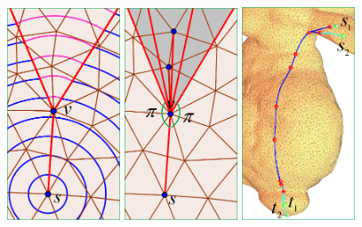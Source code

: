 \begin{figure}[htbp]
\centering
\includegraphics[width=0.3\textwidth]{figs/svg/wavefront_label.png}\hspace{0.05in}
\includegraphics[width=0.3\textwidth]{figs/svg/geodesic_split2.png}\hspace{0.05in}
\includegraphics[width=0.3\textwidth]{figs/svg/shared_path_labels2.png}\\
\\

\end{figure}
